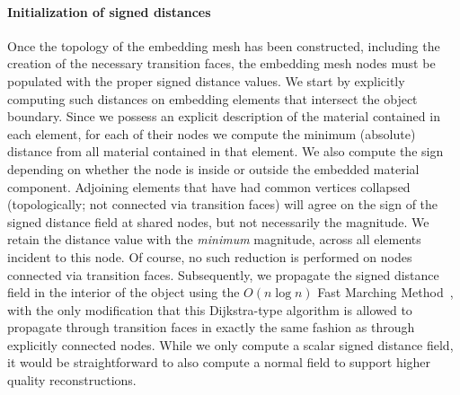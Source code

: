 \paragraph{Initialization of signed distances} Once the topology of
the embedding mesh has been constructed, including the creation of the
necessary transition faces, the embedding mesh nodes must be populated
with the proper signed distance values. We start by explicitly
computing such distances on embedding elements that intersect the
object boundary. Since we possess an explicit description of the
material contained in each element, for each of their nodes we compute
the minimum (absolute) distance from all material contained in that
element. We also compute the sign depending on whether the node is
inside or outside the embedded material component. Adjoining elements
that have had common vertices collapsed (topologically; not connected
via transition faces) will agree on the sign of the signed distance
field at shared nodes, but not necessarily the magnitude. We retain
the distance value with the \emph{minimum} magnitude, across all
elements incident to this node. Of course, no such reduction is
performed on nodes connected via transition faces. Subsequently, we
propagate the signed distance field in the interior of the object
using the $O(n\log n)$ Fast Marching Method~\citep{Sethi:1998}, with
the only modification that this Dijkstra-type algorithm is allowed to
propagate through transition faces in exactly the same fashion as
through explicitly connected nodes.  While we only compute a scalar
signed distance field, it would be straightforward to also compute a
normal field \citep{KobbeBSS:2001} to support higher quality
reconstructions.

